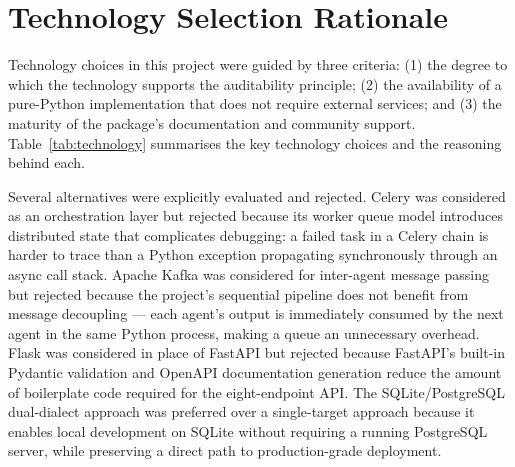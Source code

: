 \documentclass[12pt,a4paper]{report}
\begin{document}
\section{Technology Selection Rationale}
\label{sec:technology}

Technology choices in this project were guided by three criteria: (1) the degree to which the technology supports the auditability principle; (2) the availability of a pure-Python implementation that does not require external services; and (3) the maturity of the package's documentation and community support. Table~\ref{tab:technology} summarises the key technology choices and the reasoning behind each.

Several alternatives were explicitly evaluated and rejected. Celery was considered as an orchestration layer but rejected because its worker queue model introduces distributed state that complicates debugging: a failed task in a Celery chain is harder to trace than a Python exception propagating synchronously through an async call stack. Apache Kafka was considered for inter-agent message passing but rejected because the project's sequential pipeline does not benefit from message decoupling — each agent's output is immediately consumed by the next agent in the same Python process, making a queue an unnecessary overhead. Flask was considered in place of FastAPI but rejected because FastAPI's built-in Pydantic validation and OpenAPI documentation generation reduce the amount of boilerplate code required for the eight-endpoint API. The SQLite/PostgreSQL dual-dialect approach was preferred over a single-target approach because it enables local development on SQLite without requiring a running PostgreSQL server, while preserving a direct path to production-grade deployment.
\end{document}
